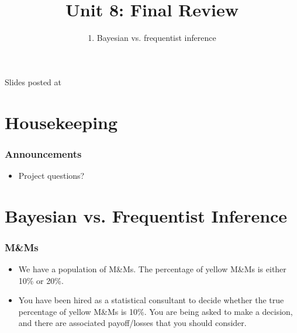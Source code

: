 \documentclass[slidestop,compress,mathserif,12pt,t,professionalfonts,xcolor=table]{beamer}
\title{Unit 8: Final Review}
\subtitle{1. Bayesian vs. frequentist inference}
\author{\CourseName}
\date{}
\institute{\InstituteName}
\begin{document}



\begin{frame}[plain]

\titlepage

\vfill

{\scriptsize {} \hfill Slides posted at  \webURL{\CourseSite}}

\addtocounter{framenumber}{-1} 

\end{frame}


\section{Housekeeping}


\begin{frame}
\frametitle{Announcements}

\begin{itemize}

\item Project questions?

\end{itemize}

\end{frame}


\section{Bayesian vs. Frequentist Inference}


\begin{frame}
\frametitle{M\&Ms}

\begin{itemize}

\item We have a population of M\&Ms. The percentage of yellow M\&Ms is either 10\% or 20\%.

\item You have been hired as a statistical consultant to decide whether the true percentage of yellow M\&Ms is 10\%. You are being asked to make a decision, and there are associated payoff/losses that you should consider.

\end{itemize}

\end{frame}
\end{document}
